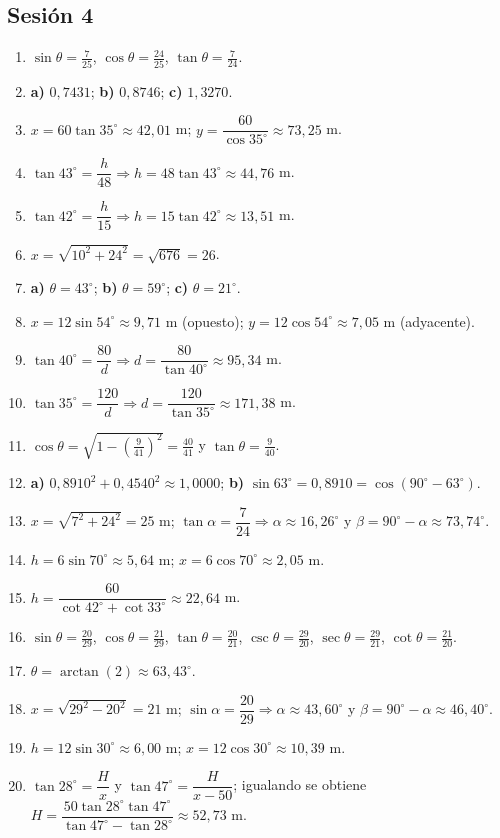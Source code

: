 \documentclass[12pt, letterpaper]{article}
\providecommand{\sen}{\sin}
\begin{document}
\subsection*{Sesión 4}
\begin{enumerate}[leftmargin=*, label=\textbf{\arabic*.}]
  \item $\sen\theta=\frac{7}{25}$, $\cos\theta=\frac{24}{25}$, $\tan\theta=\frac{7}{24}$.
  \item \textbf{a)} $0{,}7431$; \quad \textbf{b)} $0{,}8746$; \quad \textbf{c)} $1{,}3270$.
  \item $x=60\tan 35^{\circ}\approx 42{,}01$ m; $y=\dfrac{60}{\cos 35^{\circ}}\approx 73{,}25$ m.
  \item $\tan 43^{\circ}=\dfrac{h}{48}\Rightarrow h=48\tan 43^{\circ}\approx 44{,}76$ m.
  \item $\tan 42^{\circ}=\dfrac{h}{15}\Rightarrow h=15\tan 42^{\circ}\approx 13{,}51$ m.
  \item $x=\sqrt{10^2+24^2}=\sqrt{676}=26$.
  \item \textbf{a)} $\theta=43^{\circ}$; \quad \textbf{b)} $\theta=59^{\circ}$; \quad \textbf{c)} $\theta=21^{\circ}$.
  \item $x=12\sen 54^{\circ}\approx 9{,}71$ m (opuesto); $y=12\cos 54^{\circ}\approx 7{,}05$ m (adyacente).
  \item $\tan 40^{\circ}=\dfrac{80}{d}\Rightarrow d=\dfrac{80}{\tan 40^{\circ}}\approx 95{,}34$ m.
  \item $\tan 35^{\circ}=\dfrac{120}{d}\Rightarrow d=\dfrac{120}{\tan 35^{\circ}}\approx 171{,}38$ m.
  \item $\cos\theta=\sqrt{1-\left(\frac{9}{41}\right)^2}=\frac{40}{41}$ y $\tan\theta=\frac{9}{40}$.
  \item \textbf{a)} $0{,}8910^2+0{,}4540^2\approx 1{,}0000$; \quad \textbf{b)} $\sen 63^{\circ}=0{,}8910=\cos(90^{\circ}-63^{\circ})$. \checkmark
  \item $x=\sqrt{7^2+24^2}=25$ m; $\tan\alpha=\dfrac{7}{24}\Rightarrow\alpha\approx 16{,}26^{\circ}$ y $\beta=90^{\circ}-\alpha\approx 73{,}74^{\circ}$.
  \item $h=6\sen 70^{\circ}\approx 5{,}64$ m; $x=6\cos 70^{\circ}\approx 2{,}05$ m.
  \item $h=\dfrac{60}{\cot 42^{\circ}+\cot 33^{\circ}}\approx 22{,}64$ m.
  \item $\sen\theta=\frac{20}{29}$, $\cos\theta=\frac{21}{29}$, $\tan\theta=\frac{20}{21}$, $\csc\theta=\frac{29}{20}$, $\sec\theta=\frac{29}{21}$, $\cot\theta=\frac{21}{20}$.
  \item $\theta=\arctan\left(2\right)\approx 63{,}43^{\circ}$.
  \item $x=\sqrt{29^2-20^2}=21$ m; $\sen\alpha=\dfrac{20}{29}\Rightarrow\alpha\approx 43{,}60^{\circ}$ y $\beta=90^{\circ}-\alpha\approx 46{,}40^{\circ}$.
  \item $h=12\sen 30^{\circ}\approx 6{,}00$ m; $x=12\cos 30^{\circ}\approx 10{,}39$ m.
  \item $\tan 28^{\circ}=\dfrac{H}{x}$ y $\tan 47^{\circ}=\dfrac{H}{x-50}$; igualando se obtiene $H=\dfrac{50\tan 28^{\circ}\tan 47^{\circ}}{\tan 47^{\circ}-\tan 28^{\circ}}\approx 52{,}73$ m.
\end{enumerate}
\end{document}
